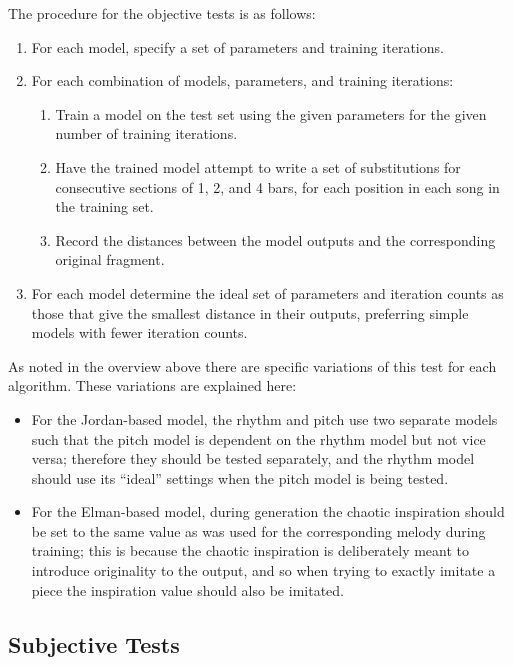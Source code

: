 \documentclass[ author={Stephen Livermore-Tozer},
				supervisor={Dr. Peter Flach},
				degree={MEng},
				title={Algorithmic Co-composition Using Machine Learning},
				subtitle={},
				type={research},
				year={2016} ]{dissertation}
\begin{document}
	The procedure for the objective tests is as follows:
	\begin{enumerate}
		\item For each model, specify a set of parameters and training iterations.
		\item For each combination of models, parameters, and training iterations:
		\begin{enumerate}
			\item Train a model on the test set using the given parameters for the given number of training iterations.
			\item Have the trained model attempt to write a set of substitutions for consecutive sections of 1, 2, and 4 bars, for each position in each song in the training set.
			\item Record the distances between the model outputs and the corresponding original fragment.
		\end{enumerate}
		\item For each model determine the ideal set of parameters and iteration counts as those that give the smallest distance in their outputs, preferring simple models with fewer iteration counts.
	\end{enumerate}
	
	As noted in the overview above there are specific variations of this test for each algorithm. These variations are explained here:
	\begin{itemize}
		\item For the Jordan-based model, the rhythm and pitch use two separate models such that the pitch model is dependent on the rhythm model but not vice versa; therefore they should be tested separately, and the rhythm model should use its ``ideal'' settings when the pitch model is being tested.
		\item For the Elman-based model, during generation the chaotic inspiration should be set to the same value as was used for the corresponding melody during training; this is because the chaotic inspiration is deliberately meant to introduce originality to the output, and so when trying to exactly imitate a piece the inspiration value should also be imitated.
	\end{itemize}
	
	\subsection{Subjective Tests}
	\label{sec:subjective-analysis}
	
\end{document}
